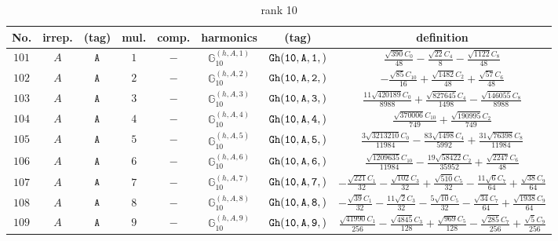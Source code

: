 \documentclass[fleqn,8pt]{jsarticle}
\begin{document}
\begin{table}[ht!]
\begin{center}
\caption{rank 10}
\renewcommand{\arraystretch}{1.3}
\begin{tabular}{cccccccc} \hline \hline
No. & irrep. & (tag) & mul. & comp. & harmonics & (tag) & definition \\ \hline
$ 101 $ & $ A $ & $ {\tt A} $ & $ 1 $ & $ - $ & $ \mathbb{G}_{10}^{(h,A,1)} $ & $ {\tt Gh(10,A,1,)} $ & $ \frac{\sqrt{390} C_{0}}{48} - \frac{\sqrt{22} C_{4}}{8} - \frac{\sqrt{1122} C_{8}}{48} $ \\
$ 102 $ & $ A $ & $ {\tt A} $ & $ 2 $ & $ - $ & $ \mathbb{G}_{10}^{(h,A,2)} $ & $ {\tt Gh(10,A,2,)} $ & $ - \frac{\sqrt{85} C_{10}}{16} + \frac{\sqrt{1482} C_{2}}{48} + \frac{\sqrt{57} C_{6}}{48} $ \\
$ 103 $ & $ A $ & $ {\tt A} $ & $ 3 $ & $ - $ & $ \mathbb{G}_{10}^{(h,A,3)} $ & $ {\tt Gh(10,A,3,)} $ & $ \frac{11 \sqrt{420189} C_{0}}{8988} + \frac{\sqrt{827645} C_{4}}{1498} - \frac{\sqrt{146055} C_{8}}{8988} $ \\
$ 104 $ & $ A $ & $ {\tt A} $ & $ 4 $ & $ - $ & $ \mathbb{G}_{10}^{(h,A,4)} $ & $ {\tt Gh(10,A,4,)} $ & $ \frac{\sqrt{370006} C_{10}}{749} + \frac{\sqrt{190995} C_{2}}{749} $ \\
$ 105 $ & $ A $ & $ {\tt A} $ & $ 5 $ & $ - $ & $ \mathbb{G}_{10}^{(h,A,5)} $ & $ {\tt Gh(10,A,5,)} $ & $ \frac{3 \sqrt{3213210} C_{0}}{11984} - \frac{83 \sqrt{1498} C_{4}}{5992} + \frac{31 \sqrt{76398} C_{8}}{11984} $ \\
$ 106 $ & $ A $ & $ {\tt A} $ & $ 6 $ & $ - $ & $ \mathbb{G}_{10}^{(h,A,6)} $ & $ {\tt Gh(10,A,6,)} $ & $ \frac{\sqrt{1209635} C_{10}}{11984} - \frac{19 \sqrt{58422} C_{2}}{35952} + \frac{\sqrt{2247} C_{6}}{48} $ \\
$ 107 $ & $ A $ & $ {\tt A} $ & $ 7 $ & $ - $ & $ \mathbb{G}_{10}^{(h,A,7)} $ & $ {\tt Gh(10,A,7,)} $ & $ - \frac{\sqrt{221} C_{1}}{32} - \frac{\sqrt{102} C_{3}}{32} + \frac{\sqrt{510} C_{5}}{32} - \frac{11 \sqrt{6} C_{7}}{64} + \frac{\sqrt{38} C_{9}}{64} $ \\
$ 108 $ & $ A $ & $ {\tt A} $ & $ 8 $ & $ - $ & $ \mathbb{G}_{10}^{(h,A,8)} $ & $ {\tt Gh(10,A,8,)} $ & $ - \frac{\sqrt{39} C_{1}}{32} - \frac{11 \sqrt{2} C_{3}}{32} - \frac{5 \sqrt{10} C_{5}}{32} - \frac{\sqrt{34} C_{7}}{64} + \frac{\sqrt{1938} C_{9}}{64} $ \\
$ 109 $ & $ A $ & $ {\tt A} $ & $ 9 $ & $ - $ & $ \mathbb{G}_{10}^{(h,A,9)} $ & $ {\tt Gh(10,A,9,)} $ & $ \frac{\sqrt{41990} C_{1}}{256} - \frac{\sqrt{4845} C_{3}}{128} + \frac{\sqrt{969} C_{5}}{128} - \frac{\sqrt{285} C_{7}}{256} + \frac{\sqrt{5} C_{9}}{256} $ \\

\end{tabular}
\end{center}
\end{table}
\end{document}
